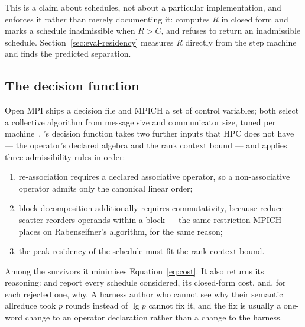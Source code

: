 This is a claim about schedules, not about a particular implementation, and
\ampi{} enforces it rather than merely documenting it:
 computes $R$ in closed form and marks a schedule
inadmissible when $R > C$, and  refuses to return an
inadmissible schedule.  Section~\ref{sec:eval-residency} measures $R$ directly
from the step machine and finds the predicted separation.

\subsection{The decision function}

Open MPI ships a  decision file and MPICH a set of control
variables; both select a collective algorithm from message size and
communicator size, tuned per machine~\cite{thakur2005collectives,gabriel2004openmpi}.
\ampi's decision function takes two further inputs that HPC does not have --- the
operator's declared algebra and the rank context bound --- and applies three
admissibility rules in order:

\begin{enumerate}
\item re-association requires a declared associative operator, so a
non-associative operator admits only the canonical linear order;
\item block decomposition additionally requires commutativity, because
reduce-scatter reorders operands within a block --- the same restriction MPICH
places on Rabenseifner's algorithm, for the same reason;
\item the peak residency of the schedule must fit the rank context bound.
\end{enumerate}

Among the survivors it minimises Equation~\ref{eq:cost}.  It also returns its
reasoning:  and  report every schedule
considered, its closed-form cost, and, for each rejected one, why.  A harness
author who cannot see why their semantic allreduce took $p$ rounds instead of
$\lg p$ cannot fix it, and the fix is usually a one-word change to an operator
declaration rather than a change to the harness.
